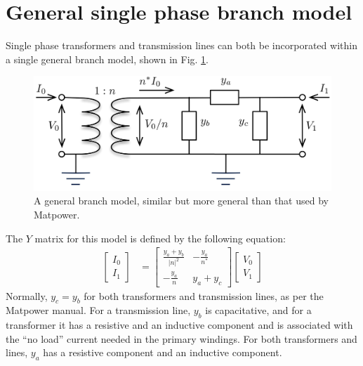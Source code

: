 \documentclass[10pt]{article}
\begin{document}
\section{General single phase branch model}
\label{SEC_GEN_BRANCH_MODEL}
Single phase transformers and transmission lines can both be incorporated within a single general branch model, shown in Fig. \ref{FIG_GEN_BRANCH_MODEL}.
\begin{figure}[!h]
	\begin{center}
		\includegraphics[width=(9cm)]{branch.png}
	\end{center}
	\caption{
		A general branch model, similar but more general than that used by {\sc Matpower}.
	}
	\label{FIG_GEN_BRANCH_MODEL}
\end{figure}
The $Y$ matrix for this model is defined by the following equation:
\begin{align}
	\begin{bmatrix}I_0 \\ I_1\end{bmatrix} &=
	\begin{bmatrix}\frac{y_a + y_b}{|n|^2} & -\frac{y_a}{n^*} \\ -\frac{y_a}{n} & y_a + y_c \end{bmatrix}
	\begin{bmatrix}V_0 \\ V_1\end{bmatrix}
\end{align}
Normally, $y_c = y_b$ for both transformers and transmission lines, as per the {\sc Matpower} manual. For a transmission line, $y_b$ is capacitative, and for a transformer it has a resistive and an inductive component and is associated with the ``no load'' current needed in the primary windings. For both transformers and lines, $y_a$ has a resistive component and an inductive component.
\end{document}
